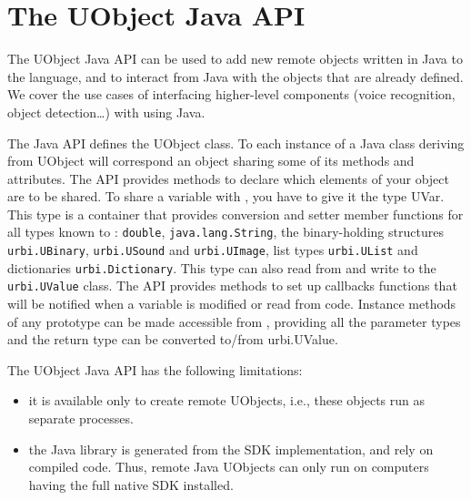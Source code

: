 

\chapter{The UObject Java API}
\label{sec:uob:apijava}

The UObject Java API can be used to add new remote objects written in Java
to the \us language, and to interact from Java with the objects that are
already defined. We cover the use cases of interfacing higher-level
components (voice recognition, object detection\ldots) with \urbi using
Java.

The Java API defines the UObject class. To each instance of a Java class
deriving from UObject will correspond an \us object sharing some of its
methods and attributes. The API provides methods to declare which elements
of your object are to be shared. To share a variable with \urbi, you have to
give it the type UVar. This type is a container that provides conversion and
setter member functions for all types known to \urbi: \lstinline{double},
\lstinline{java.lang.String}, the binary-holding structures
\lstinline{urbi.UBinary}, \lstinline{urbi.USound} and
\lstinline{urbi.UImage}, list types \lstinline{urbi.UList} and dictionaries
\lstinline{urbi.Dictionary}. This type can also read from and write to the
\lstinline{urbi.UValue} class. The API provides methods to set up callbacks
functions that will be notified when a variable is modified or read from
\us code. Instance methods of any prototype can be made accessible
from \us, providing all the parameter types and the return type can be
converted to/from urbi.UValue.

The UObject Java API has the following limitations:
\begin{itemize}
\item it is available only to create remote UObjects, i.e., these objects
  run as separate processes.
\item the Java library is generated from the \Cxx SDK implementation, and
  rely on compiled \Cxx code. Thus, remote Java UObjects can only run on
  computers having the full \urbi native SDK installed.
\end{itemize}


